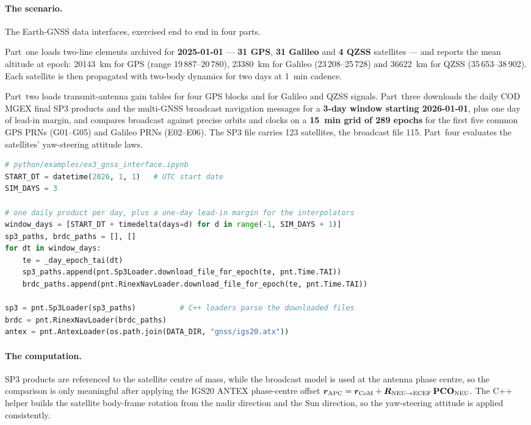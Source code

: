 \paragraph{The scenario.}
The Earth-GNSS data interfaces, exercised end to end in four parts.

Part~one loads two-line elements archived for \textbf{2025-01-01} ---
\textbf{31 GPS}, \textbf{31 Galileo} and \textbf{4 QZSS} satellites --- and
reports the mean altitude at epoch: \SI{20143}{\kilo\meter} for GPS (range
19\,887--20\,780), \SI{23380}{\kilo\meter} for Galileo (23\,208--25\,728) and
\SI{36622}{\kilo\meter} for QZSS (35\,653--38\,902). Each satellite is then
propagated with two-body dynamics for two days at \SI{1}{\minute} cadence.

Part~two loads transmit-antenna gain tables for four GPS blocks and for Galileo
and QZSS signals. Part~three downloads the daily COD MGEX final SP3 products and
the multi-GNSS broadcast navigation messages for a \textbf{3-day window starting
2026-01-01}, plus one day of lead-in margin, and compares broadcast against
precise orbits and clocks on a \textbf{\SI{15}{\minute} grid of 289 epochs} for
the first five common GPS PRNs (G01--G05) and Galileo PRNs (E02--E06). The SP3
file carries 123 satellites, the broadcast file 115. Part~four evaluates the
satellites' yaw-steering attitude laws.

\begin{lstlisting}[language=py, caption={Downloading and parsing the precise and broadcast products.}, label={lst:tut-ex3-load}]
# python/examples/ex3_gnss_interface.ipynb
START_DT = datetime(2026, 1, 1)   # UTC start date
SIM_DAYS = 3

# one daily product per day, plus a one-day lead-in margin for the interpolators
window_days = [START_DT + timedelta(days=d) for d in range(-1, SIM_DAYS + 1)]
sp3_paths, brdc_paths = [], []
for dt in window_days:
    te = _day_epoch_tai(dt)
    sp3_paths.append(pnt.Sp3Loader.download_file_for_epoch(te, pnt.Time.TAI))
    brdc_paths.append(pnt.RinexNavLoader.download_file_for_epoch(te, pnt.Time.TAI))

sp3 = pnt.Sp3Loader(sp3_paths)          # C++ loaders parse the downloaded files
brdc = pnt.RinexNavLoader(brdc_paths)
antex = pnt.AntexLoader(os.path.join(DATA_DIR, "gnss/igs20.atx"))
\end{lstlisting}

\paragraph{The computation.}
SP3 products are referenced to the satellite centre of mass, while the broadcast
model is used at the antenna phase centre, so the comparison is only meaningful
after applying the IGS20 ANTEX phase-centre offset
$\bm{r}_\mathrm{APC} = \bm{r}_\mathrm{CoM}
 + \bm{R}_{\mathrm{NEU}\to\mathrm{ECEF}}\,\mathbf{PCO}_\mathrm{NEU}$.
The C++ helper builds the satellite body-frame rotation from the nadir direction
and the Sun direction, so the yaw-steering attitude is applied consistently.

